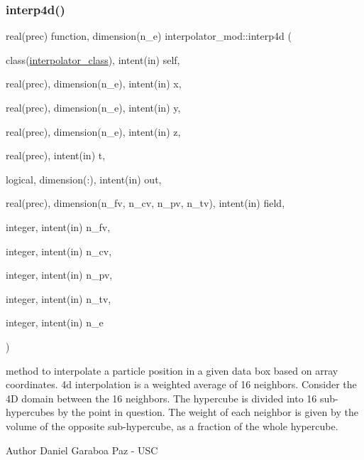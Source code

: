 \mbox{\label{namespaceinterpolator__mod_a4d21fa0242d7cf7742a44d85314ec183}} 
\subsubsection{\texorpdfstring{interp4d()}{interp4d()}}
{\footnotesize\ttfamily real(prec) function, dimension(n\+\_\+e) interpolator\+\_\+mod\+::interp4d (\begin{DoxyParamCaption}\item[{class(\mbox{\hyperlink{structinterpolator__mod_1_1interpolator__class}{interpolator\+\_\+class}}), intent(in)}]{self,  }\item[{real(prec), dimension(n\+\_\+e), intent(in)}]{x,  }\item[{real(prec), dimension(n\+\_\+e), intent(in)}]{y,  }\item[{real(prec), dimension(n\+\_\+e), intent(in)}]{z,  }\item[{real(prec), intent(in)}]{t,  }\item[{logical, dimension(\+:), intent(in)}]{out,  }\item[{real(prec), dimension(n\+\_\+fv, n\+\_\+cv, n\+\_\+pv, n\+\_\+tv), intent(in)}]{field,  }\item[{integer, intent(in)}]{n\+\_\+fv,  }\item[{integer, intent(in)}]{n\+\_\+cv,  }\item[{integer, intent(in)}]{n\+\_\+pv,  }\item[{integer, intent(in)}]{n\+\_\+tv,  }\item[{integer, intent(in)}]{n\+\_\+e }\end{DoxyParamCaption})\hspace{0.3cm}{\ttfamily [private]}}



method to interpolate a particle position in a given data box based on array coordinates. 4d interpolation is a weighted average of 16 neighbors. Consider the 4D domain between the 16 neighbors. The hypercube is divided into 16 sub-\/hypercubes by the point in question. The weight of each neighbor is given by the volume of the opposite sub-\/hypercube, as a fraction of the whole hypercube. 

\begin{DoxyAuthor}{Author}
Daniel Garaboa Paz -\/ U\+SC 
\end{DoxyAuthor}

